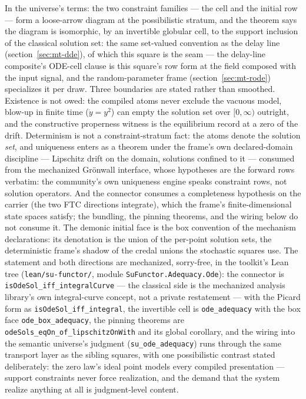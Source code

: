 In the universe's terms: the two constraint families --- the cell
and the initial row --- form a loose-arrow diagram at the
possibilistic stratum, and the theorem says the diagram is
isomorphic, by an invertible globular cell, to the support inclusion
of the classical solution set: the same set-valued convention as the
delay line (section~\ref{sec:mt-dde}), of which this square is the
seam --- the delay-line composite's ODE-cell clause is this square's
row form at the field composed with the input signal, and the
random-parameter frame (section~\ref{sec:mt-rode}) specializes it per
draw. Three boundaries are stated rather than
smoothed. Existence is not owed: the compiled atoms never exclude
the vacuous model, blow-up in finite time ($\dot y = y^2$) can empty
the solution set over $[0,\infty)$ outright, and the constructive
properness witness is the equilibrium record at a zero of the drift.
Determinism is not a constraint-stratum fact: the atoms denote the
solution \emph{set}, and uniqueness enters as a theorem under the
frame's own declared-domain discipline --- Lipschitz drift on the
domain, solutions confined to it --- consumed from the mechanized
Gr\"onwall interface, whose hypotheses are the forward rows
verbatim: the community's own uniqueness engine speaks constraint
rows, not solution operators. And the connector consumes a
completeness hypothesis on the carrier (the two FTC directions integrate), which
the frame's finite-dimensional state spaces satisfy; the bundling,
the pinning theorems, and the wiring below do not consume it. The
demonic initial face is the box convention of the mechanism
declarations: its denotation is the union of the per-point solution
sets, the deterministic frame's shadow of the credal unions the
stochastic squares use. The statement and both directions are
mechanized, sorry-free, in the toolkit's Lean tree
(\texttt{lean/su-functor/}, module \texttt{SuFunctor.Adequacy.Ode}):
the connector is \texttt{isOdeSol\_iff\_integralCurve} --- the
classical side is the mechanized analysis library's own
integral-curve concept, not a private restatement --- with the
Picard form as \texttt{isOdeSol\_iff\_integral}, the invertible cell
is \texttt{ode\_adequacy} with the box face
\texttt{ode\_box\_adequacy}, the pinning theorems are
\texttt{odeSols\_eqOn\_of\_lipschitzOnWith} and its global
corollary, and the wiring into the semantic universe's judgment
(\texttt{su\_ode\_adequacy}) runs through the same transport layer
as the sibling squares, with one possibilistic contrast stated deliberately:
the zero law's ideal point models every compiled presentation ---
support constraints never force realization, and the demand that the
system realize anything at all is judgment-level content.

